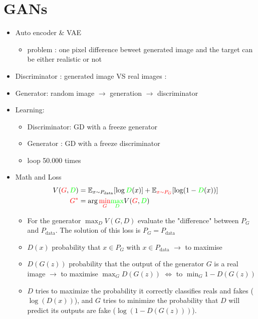 \documentclass{article}
\theoremstyle{plain}%
\theoremstyle{definition}
\theoremstyle{remark}
\begin{document}
\section{GANs}
\begin{itemize}
    \item Auto encoder \& VAE \begin{itemize}
        \item problem : one pixel difference beweet generated image and the target can be either realistic or not
    \end{itemize}
    \item Discriminator : generated image VS real images :
    \item Generator: random image $\rightarrow$ generation $\rightarrow$ discriminator
    \item Learning: \begin{itemize}
        \item Discriminator: GD with a freeze generator
        \item Generator : GD with a freeze discriminator
        \item loop 50.000 times
    \end{itemize}
    \item Math and Loss \begin{align*}
        V(\textcolor{red}{G}, \textcolor{green}{D}) & = \mathbb{E}_{x\sim P_{\text{data}}}[\log \textcolor{green}{D}(x)] + \mathbb{E}_{\textcolor{red}{x\sim P_G}}[\log(1 - \textcolor{green}{D}(x))] \\
        \textcolor{red}{G^*}                        & = \arg \textcolor{red}{\min_{G}} \textcolor{green}{\max_{D}} V(\textcolor{red}{G}, \textcolor{green}{D})
    \end{align*} \begin{itemize}
        \item For the generator $ \max _D V(G,D) $ evaluate the "difference" between $ P_G $ and $ P_{\text{data}} $. The solution of this loss is $ P_G = P_{\text{data}} $ 
        \item $ D(x) $ probability that $ x \in P_G $ with $ x \in P_{\text{data}} $  $\rightarrow$ to maximise
        \item $ D(G(z)) $ probability that the output of the generator $ G $  is a real image $\rightarrow$ to maximise $ \max _G D(G(z)) $  $ \Leftrightarrow $ to $ \min _G 1 - D(G(z)) $  
        \item \( D \) tries to maximize the probability it correctly classifies reals and fakes (\( \log(D(x)) \)), and \( G \) tries to minimize the probability that \( D \) will predict its outputs are fake (\( \log(1 - D(G(z))) \)).

\end{itemize}
\end{itemize}
\end{document}
